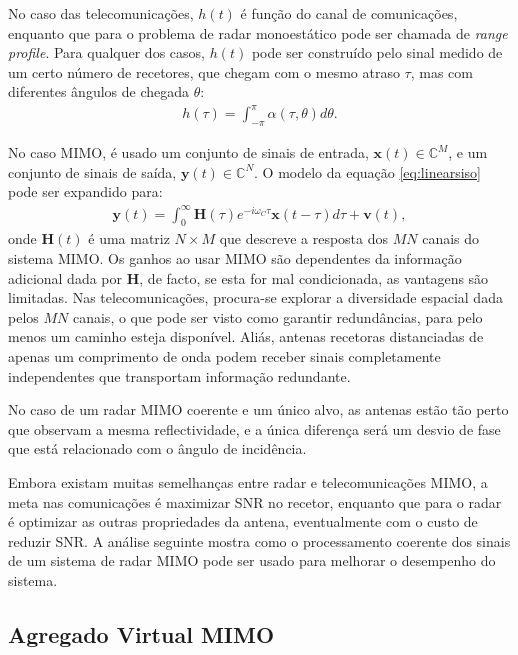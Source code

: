 \documentclass[purist,portuguese]{ist-report}
\begin{document}
No caso das telecomunicações, $h(t)$ é função do canal de comunicações, enquanto que para o problema de radar monoestático pode ser chamada de \textit{range profile}.
Para qualquer dos casos, $h(t)$ pode ser construído pelo sinal medido de um certo número de recetores, que chegam com o mesmo atraso $\tau$, mas com diferentes ângulos de chegada $\theta$:
\begin{align}
  h(\tau) = \int_{-\pi}^{\pi}\alpha(\tau,\theta)d\theta.
  \label{eq:profile}
\end{align}

No caso MIMO, é usado um conjunto de sinais de entrada, $\mathbf{x}(t)\in\mathbb{C}^M$, e um conjunto de sinais de saída, $\mathbf{y}(t)\in\mathbb{C}^N$.
O modelo da equação \ref{eq:linearsiso} pode ser expandido para:
\begin{align}
  \mathbf{y}(t) = \int_0^\infty \mathbf{H}(\tau)e^{-i\omega_C \tau}\mathbf{x}(t-\tau)d\tau + \mathbf{v}(t),
  \label{eq:linearmimo}
\end{align}
onde $\mathbf{H}(t)$ é uma matriz $N\times M$ que descreve a resposta dos $MN$ canais do sistema MIMO.
Os ganhos ao usar MIMO são dependentes da informação adicional dada por $\mathbf{H}$, de facto, se esta for mal condicionada, as vantagens são limitadas. 
Nas telecomunicações, procura-se explorar a diversidade espacial dada pelos $MN$ canais, o que pode ser visto como garantir redundâncias, para pelo menos um caminho esteja disponível.
Aliás, antenas recetoras distanciadas de apenas um comprimento de onda podem receber sinais completamente independentes que transportam informação redundante.

No caso de um radar MIMO coerente e um único alvo, as antenas estão tão perto que observam a mesma reflectividade, e a única diferença será um desvio de fase que está relacionado com o ângulo de incidência.

Embora existam muitas semelhanças entre radar e telecomunicações MIMO, a meta nas comunicações é maximizar SNR no recetor, enquanto que para o radar é optimizar as outras propriedades da antena, eventualmente com o custo de reduzir SNR.
A análise seguinte mostra como o processamento coerente dos sinais de um sistema de radar MIMO pode ser usado para melhorar o desempenho do sistema.

\subsection{Agregado Virtual MIMO}
\end{document}
